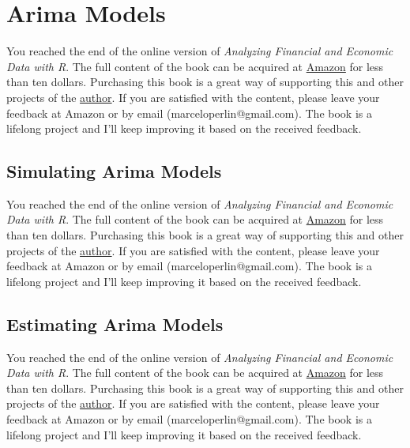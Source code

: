 \documentclass[
  12pt,
]{book}
\newenvironment{pleasebuyit}
{\begin{noteblock}
		
	} {\end{noteblock}}
\begin{document}
\hypertarget{arima-models}{%
\section{Arima Models}\label{arima-models}}

\begin{pleasebuyit}
You reached the end of the online version of \emph{Analyzing Financial
and Economic Data with R}. The full content of the book can be acquired
at \href{https://www.amazon.com/dp/B084LSNXMN}{Amazon} for less than ten
dollars. Purchasing this book is a great way of supporting this and
other projects of the \href{https://www.msperlin.com/}{author}. If you
are satisfied with the content, please leave your feedback at Amazon or
by email (marceloperlin@gmail.com). The book is a lifelong project and
I'll keep improving it based on the received feedback.
\end{pleasebuyit}

\hypertarget{simulating-arima-models}{%
\subsection{Simulating Arima Models}\label{simulating-arima-models}}

\begin{pleasebuyit}
You reached the end of the online version of \emph{Analyzing Financial
and Economic Data with R}. The full content of the book can be acquired
at \href{https://www.amazon.com/dp/B084LSNXMN}{Amazon} for less than ten
dollars. Purchasing this book is a great way of supporting this and
other projects of the \href{https://www.msperlin.com/}{author}. If you
are satisfied with the content, please leave your feedback at Amazon or
by email (marceloperlin@gmail.com). The book is a lifelong project and
I'll keep improving it based on the received feedback.
\end{pleasebuyit}

\hypertarget{arima-estimating}{%
\subsection{Estimating Arima Models}\label{arima-estimating}}

\begin{pleasebuyit}
You reached the end of the online version of \emph{Analyzing Financial
and Economic Data with R}. The full content of the book can be acquired
at \href{https://www.amazon.com/dp/B084LSNXMN}{Amazon} for less than ten
dollars. Purchasing this book is a great way of supporting this and
other projects of the \href{https://www.msperlin.com/}{author}. If you
are satisfied with the content, please leave your feedback at Amazon or
by email (marceloperlin@gmail.com). The book is a lifelong project and
I'll keep improving it based on the received feedback.
\end{pleasebuyit}
\end{document}
